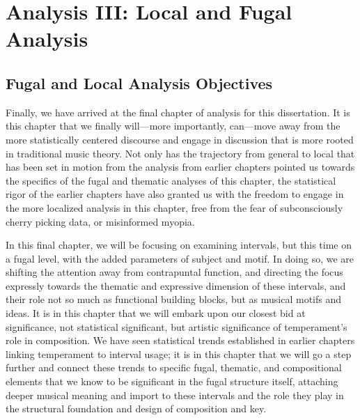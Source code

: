     
    
    

    \hypertarget{Analysis III: Local and Fugal Analysis}{\chapter{Analysis III: Local and Fugal Analysis}\label{Analysis III: Local and Fugal Analysis}}


    \section{Fugal and Local Analysis
Objectives}\label{fugal-and-local-analysis-objectives}

    Finally, we have arrived at the final chapter of analysis for this
dissertation. It is this chapter that we finally will---more
importantly, can---move away from the more statistically centered
discourse and engage in discussion that is more rooted in traditional
music theory. Not only has the trajectory from general to local that has
been set in motion from the analysis from earlier chapters pointed us
towards the specifics of the fugal and thematic analyses of this
chapter, the statistical rigor of the earlier chapters have also granted
us with the freedom to engage in the more localized analysis in this
chapter, free from the fear of subconsciously cherry picking data, or
misinformed myopia.

In this final chapter, we will be focusing on examining intervals, but
this time on a fugal level, with the added parameters of subject and
motif. In doing so, we are shifting the attention away from contrapuntal
function, and directing the focus expressly towards the thematic and
expressive dimension of these intervals, and their role not so much as
functional building blocks, but as musical motifs and ideas. It is in
this chapter that we will embark upon our closest bid at significance,
not statistical significant, but artistic significance of temperament's
role in composition. We have seen statistical trends established in
earlier chapters linking temperament to interval usage; it is in this
chapter that we will go a step further and connect these trends to
specific fugal, thematic, and compositional elements that we know to be
significant in the fugal structure itself, attaching deeper musical
meaning and import to these intervals and the role they play in the
structural foundation and design of composition and key.

